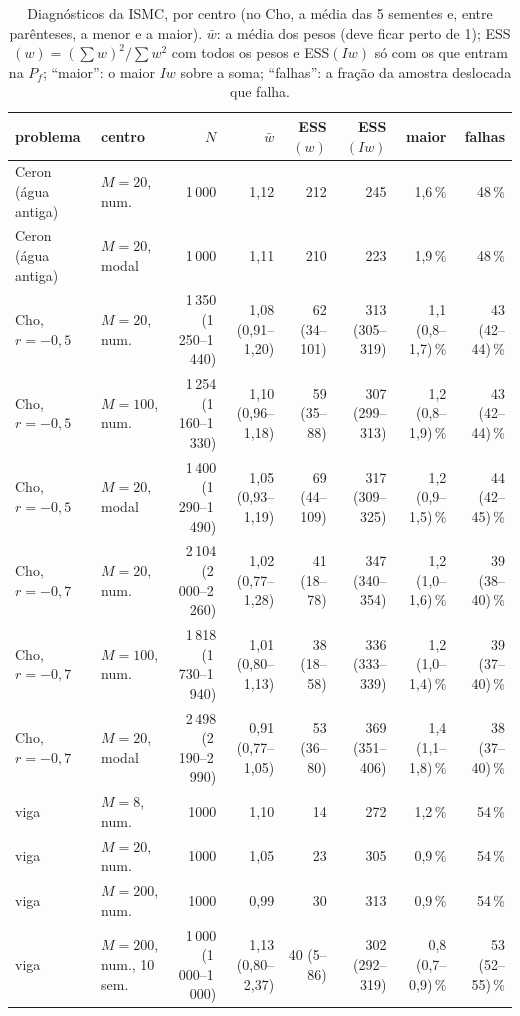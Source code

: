 \begin{landscape}
\begin{table}[H]\centering\footnotesize
\caption{Diagnósticos da ISMC, por centro (no Cho, a média das 5 sementes e, entre parênteses, a menor e a maior). $\bar w$: a média dos pesos (deve ficar perto de 1); ESS$(w) = (\sum w)^2/\sum w^2$ com todos os pesos e ESS$(Iw)$ só com os que entram na $P_f$; ``maior'': o maior $I w$ sobre a soma; ``falhas'': a fração da amostra deslocada que falha.}\label{tab:ismcdiag}
\begin{tabular}{llrrrrrr}\toprule
problema & centro & $N$ & $\bar w$ & ESS$(w)$ & ESS$(Iw)$ & maior & falhas \\\midrule
Ceron (água antiga) & $M = 20$, num. & 1\,000 & 1,12 & 212 & 245 & 1,6\,\% & 48\,\% \\
Ceron (água antiga) & $M = 20$, modal & 1\,000 & 1,11 & 210 & 223 & 1,9\,\% & 48\,\% \\
Cho, $r = -0{,}5$ & $M = 20$, num. & 1\,350 (1\,250--1\,440) & 1,08 (0,91--1,20) & 62 (34--101) & 313 (305--319) & 1,1 (0,8--1,7)\,\% & 43 (42--44)\,\% \\
Cho, $r = -0{,}5$ & $M = 100$, num. & 1\,254 (1\,160--1\,330) & 1,10 (0,96--1,18) & 59 (35--88) & 307 (299--313) & 1,2 (0,8--1,9)\,\% & 43 (42--44)\,\% \\
Cho, $r = -0{,}5$ & $M = 20$, modal & 1\,400 (1\,290--1\,490) & 1,05 (0,93--1,19) & 69 (44--109) & 317 (309--325) & 1,2 (0,9--1,5)\,\% & 44 (42--45)\,\% \\
Cho, $r = -0{,}7$ & $M = 20$, num. & 2\,104 (2\,000--2\,260) & 1,02 (0,77--1,28) & 41 (18--78) & 347 (340--354) & 1,2 (1,0--1,6)\,\% & 39 (38--40)\,\% \\
Cho, $r = -0{,}7$ & $M = 100$, num. & 1\,818 (1\,730--1\,940) & 1,01 (0,80--1,13) & 38 (18--58) & 336 (333--339) & 1,2 (1,0--1,4)\,\% & 39 (37--40)\,\% \\
Cho, $r = -0{,}7$ & $M = 20$, modal & 2\,498 (2\,190--2\,990) & 0,91 (0,77--1,05) & 53 (36--80) & 369 (351--406) & 1,4 (1,1--1,8)\,\% & 38 (37--40)\,\% \\
viga & $M = 8$, num. & 1000 & 1,10 & 14 & 272 & 1,2\,\% & 54\,\% \\
viga & $M = 20$, num. & 1000 & 1,05 & 23 & 305 & 0,9\,\% & 54\,\% \\
viga & $M = 200$, num. & 1000 & 0,99 & 30 & 313 & 0,9\,\% & 54\,\% \\
viga & $M = 200$, num., 10 sem. & 1\,000 (1\,000--1\,000) & 1,13 (0,80--2,37) & 40 (5--86) & 302 (292--319) & 0,8 (0,7--0,9)\,\% & 53 (52--55)\,\% \\
\bottomrule\end{tabular}\end{table}
\end{landscape}
